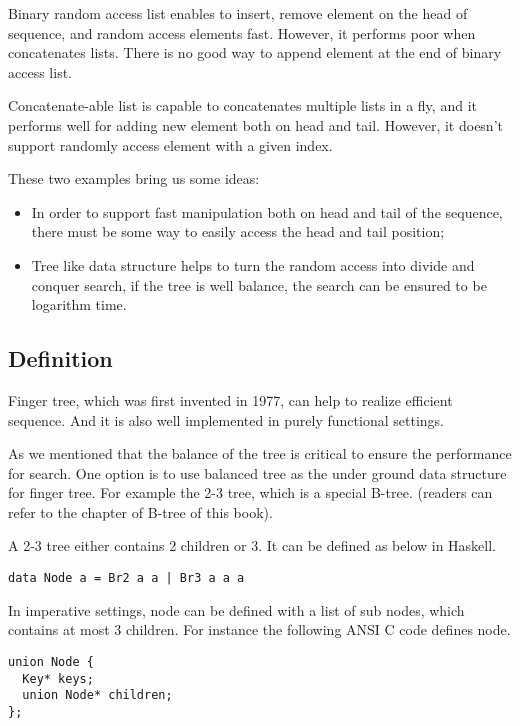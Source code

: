 \documentclass[UTF8]{article}
\begin{document}
Binary random access list enables to insert, remove element
on the head of sequence, and random access elements fast. However, it performs
poor when concatenates lists. There is no good way to append element at the
end of binary access list.

Concatenate-able list is capable to concatenates multiple lists in a fly, and
it performs well for adding new element both on head and tail. However, it doesn't
support randomly access element with a given index.

These two examples bring us some ideas:

\begin{itemize}
\item In order to support fast manipulation both on head and tail of the sequence,
there must be some way to easily access the head and tail position;
\item Tree like data structure helps to turn the random access into divide and
conquer search, if the tree is well balance, the search can be ensured to
be logarithm time.
\end{itemize}

\subsection{Definition}
Finger tree\cite{finger-tree-1977}, which was first invented in 1977, can help to
realize efficient sequence. And it is also well implemented in purely functional
settings\cite{finger-tree-2006}.

As we mentioned that the balance of the tree is critical to ensure the performance
for search. One option is to use balanced tree as the under ground data structure
for finger tree. For example the 2-3 tree, which is a special B-tree. (readers
can refer to the chapter of B-tree of this book).

A 2-3 tree either contains 2 children or 3. It can be defined as below in Haskell.

\lstset{language=Haskell}
\begin{lstlisting}
data Node a = Br2 a a | Br3 a a a
\end{lstlisting}

In imperative settings, node can be defined with a list of sub nodes, which contains
at most 3 children. For instance the following ANSI C code defines node.

\lstset{language=C}
\begin{lstlisting}
union Node {
  Key* keys;
  union Node* children;
};
\end{lstlisting}
\end{document}
